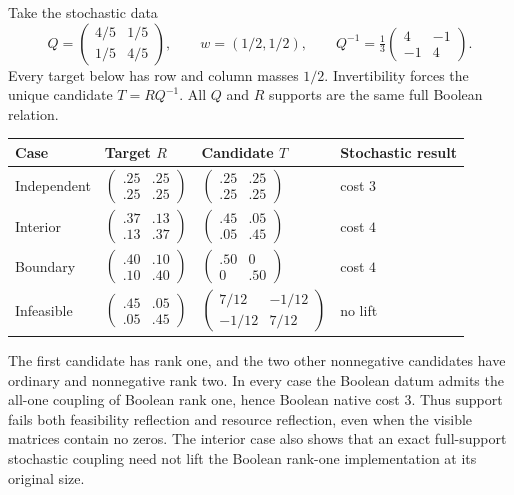 \documentclass[11pt]{article}
\theoremstyle{remark}
\begin{document}
Take the stochastic data
\[
 Q=\begin{pmatrix}4/5&1/5\\1/5&4/5\end{pmatrix},
 \qquad w=(1/2,1/2),\qquad
 Q^{-1}=\tfrac13\begin{pmatrix}4&-1\\-1&4\end{pmatrix}.
\]
Every target below has row and column masses $1/2$. Invertibility forces the unique candidate $T=RQ^{-1}$. All $Q$ and $R$ supports are the same full Boolean relation.
\begin{center}
\begin{tabular}{@{}llll@{}}
\toprule
Case & Target $R$ & Candidate $T$ & Stochastic result\\
\midrule
Independent & $\left(\begin{smallmatrix}.25&.25\\.25&.25\end{smallmatrix}\right)$ & $\left(\begin{smallmatrix}.25&.25\\.25&.25\end{smallmatrix}\right)$ & cost $3$\\[3pt]
Interior & $\left(\begin{smallmatrix}.37&.13\\.13&.37\end{smallmatrix}\right)$ & $\left(\begin{smallmatrix}.45&.05\\.05&.45\end{smallmatrix}\right)$ & cost $4$\\[3pt]
Boundary & $\left(\begin{smallmatrix}.40&.10\\.10&.40\end{smallmatrix}\right)$ & $\left(\begin{smallmatrix}.50&0\\0&.50\end{smallmatrix}\right)$ & cost $4$\\[3pt]
Infeasible & $\left(\begin{smallmatrix}.45&.05\\.05&.45\end{smallmatrix}\right)$ & $\left(\begin{smallmatrix}7/12&-1/12\\-1/12&7/12\end{smallmatrix}\right)$ & no lift\\
\bottomrule
\end{tabular}
\end{center}
The first candidate has rank one, and the two other nonnegative candidates have ordinary and nonnegative rank two. In every case the Boolean datum admits the all-one coupling of Boolean rank one, hence Boolean native cost $3$. Thus support fails both feasibility reflection and resource reflection, even when the visible matrices contain no zeros. The interior case also shows that an exact full-support stochastic coupling need not lift the Boolean rank-one implementation at its original size.
\end{document}
